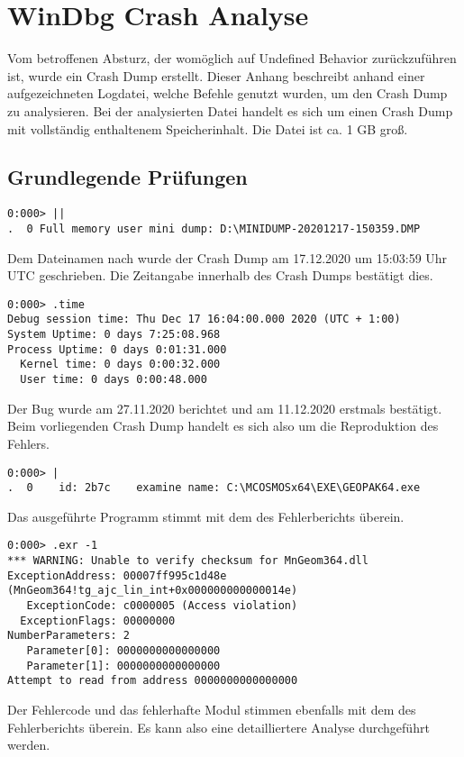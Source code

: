 \lstset{language=WinDbg}

\section{WinDbg Crash Analyse}
Vom betroffenen Absturz, der womöglich auf Undefined Behavior zurückzuführen ist, wurde ein Crash Dump erstellt.
Dieser Anhang beschreibt anhand einer aufgezeichneten Logdatei, welche Befehle genutzt wurden, um den Crash Dump zu analysieren.
Bei der analysierten Datei handelt es sich um einen Crash Dump mit vollständig enthaltenem Speicherinhalt. Die Datei ist ca. 1 GB groß.
\subsection{Grundlegende Prüfungen}
\begin{lstlisting}
0:000> ||
.  0 Full memory user mini dump: D:\MINIDUMP-20201217-150359.DMP
\end{lstlisting}
Dem Dateinamen nach wurde der Crash Dump am 17.12.2020 um 15:03:59 Uhr UTC geschrieben. Die Zeitangabe innerhalb des Crash Dumps bestätigt dies.

\begin{lstlisting}
0:000> .time
Debug session time: Thu Dec 17 16:04:00.000 2020 (UTC + 1:00)
System Uptime: 0 days 7:25:08.968
Process Uptime: 0 days 0:01:31.000
  Kernel time: 0 days 0:00:32.000
  User time: 0 days 0:00:48.000
\end{lstlisting}
Der Bug wurde am 27.11.2020 berichtet und am 11.12.2020 erstmals bestätigt. Beim vorliegenden Crash Dump handelt es sich also um die Reproduktion des Fehlers.

\begin{lstlisting}
0:000> |
.  0	id: 2b7c	examine	name: C:\MCOSMOSx64\EXE\GEOPAK64.exe
\end{lstlisting}
Das ausgeführte Programm stimmt mit dem des Fehlerberichts überein.

\begin{lstlisting}[language=WinDbg]
0:000> .exr -1
*** WARNING: Unable to verify checksum for MnGeom364.dll
ExceptionAddress: 00007ff995c1d48e (MnGeom364!tg_ajc_lin_int+0x000000000000014e)
   ExceptionCode: c0000005 (Access violation)
  ExceptionFlags: 00000000
NumberParameters: 2
   Parameter[0]: 0000000000000000
   Parameter[1]: 0000000000000000
Attempt to read from address 0000000000000000
\end{lstlisting}
Der Fehlercode und das fehlerhafte Modul stimmen ebenfalls mit dem des Fehlerberichts überein. Es kann also eine detailliertere Analyse durchgeführt werden.

